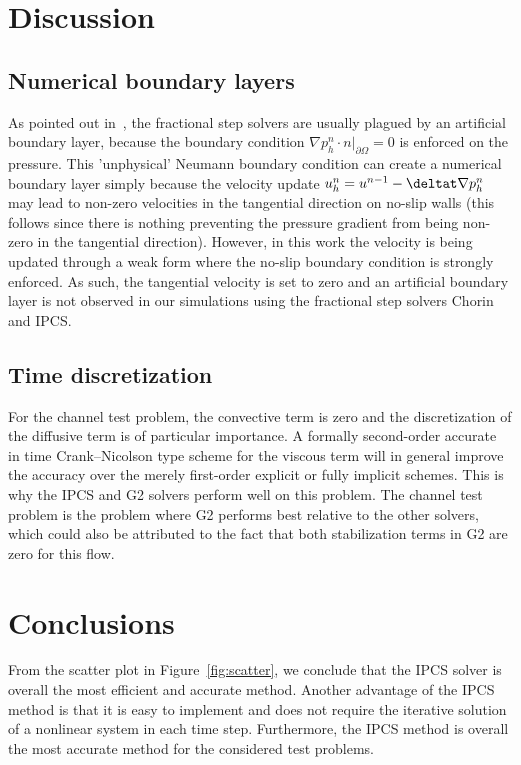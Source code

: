 \section{Discussion}
\label{Discussion}

\subsection{Numerical boundary layers}

As pointed out in~\cite{guemin}, the fractional step solvers are
usually plagued by an artificial boundary layer, because the boundary
condition $ \nabla p^n_h \cdot n |_{\partial\Omega}=0$ is enforced on
the pressure. This 'unphysical' Neumann boundary condition can create
a numerical boundary layer simply because the velocity update
$u^{n}_h=u^{n-1}-\deltat\nabla p^n_h$ may lead to non-zero velocities in
the tangential direction on no-slip walls (this follows since there is
nothing preventing the pressure gradient from being non-zero in the
tangential direction). However, in this work the velocity is being
updated through a weak form where the no-slip boundary condition is
strongly enforced. As such, the tangential velocity is set to zero and
an artificial boundary layer is not observed in our simulations using
the fractional step solvers Chorin and IPCS.

\subsection{Time discretization}

For the channel test problem, the convective term is zero and the
discretization of the diffusive term is of particular importance. A
formally second-order accurate in time Crank--Nicolson type scheme for
the viscous term will in general improve the accuracy over the merely
first-order explicit or fully implicit schemes. This is why the IPCS
and G2 solvers perform well on this problem. The channel test problem
is the problem where G2 performs best relative to the other solvers,
which could also be attributed to the fact that both stabilization
terms in G2 are zero for this flow.

\section{Conclusions}

From the scatter plot in Figure~\ref{fig:scatter}, we conclude that
the IPCS solver is overall the most efficient and accurate
method. Another advantage of the IPCS method is that it is easy to
implement and does not require the iterative solution of a nonlinear
system in each time step. Furthermore, the IPCS method is overall the
most accurate method for the considered test problems.
